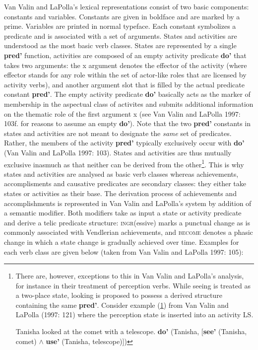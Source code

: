 Van Valin and LaPolla's lexical representations consist of two basic components: constants and variables. Constants are given in boldface and are marked by a prime. Variables are printed in normal typeface. Each constant symbolizes a predicate and is associated with a set of arguments. States and activities are understood as the most basic verb classes. States are represented by a single \textbf{pred'} function, activities are composed of an empty activity predicate \textbf{do'} that takes two arguments: the x argument denotes the effector of the activity (where effector stands for any role within the set of actor-like roles that are licensed by activity verbs), and another argument slot that is filled by the actual predicate constant \textbf{pred'}. The empty activity predicate \textbf{do'} basically acts as the marker of membership in the aspectual class of activites and submits additional information on the thematic role of the first argument x (see Van Valin and LaPolla 1997: 103f. for reasons to assume an empty \textbf{do'}). Note that the two \textbf{pred'} constants in states and activities are not meant to designate the \emph{same} set of predicates. Rather, the members of the activity \textbf{pred'} typically exclusively occur with \textbf{do'} (Van Valin and LaPolla 1997: 103). States and activities are thus mutually exclusive inasmuch as that neither can be derived from the other\footnote{There are, however, exceptions to this in Van Valin and LaPolla's analysis, for instance in their treatment of perception verbs. While seeing is treated as a two-place state, looking is proposed to possess a derived structure containing the same \textbf{pred'}. Consider example (\ref{look}) from Van Valin and LaPolla (1997: 121) where the perception state is inserted into an activity LS.

\ea \label{look}
\ea Tanisha looked at the comet with a telescope.
\ex \textbf{do'} (Tanisha, [\textbf{see'} (Tanisha, comet) $\wedge$ \textbf{use'} (Tanisha, telescope)])
\z\z
}. This is why states and activities are analysed as basic verb classes whereas achievements, accomplisments and causative predicates are secondary classes: they either take states or activities as their base. The derivation process of achievements and accomplishments is represented in Van Valin and LaPolla's system by addition of a semantic modifier. Both modifiers take as input a state or activity predicate and derive a telic predicate structure: \textsc{ingr}(essive) marks a punctual change as is commonly associated with Vendlerian achievements, and \textsc{become} denotes a phasic change in which a state change is gradually achieved over time. Examples for each verb class are given below (taken from Van Valin and LaPolla 1997: 105):


